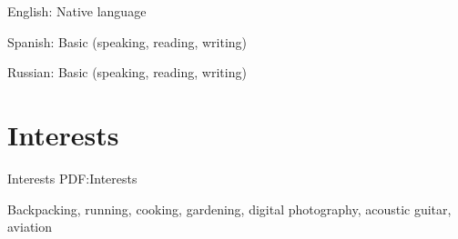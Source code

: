 \documentclass[letterpaper,MMMyyyy,nonstop]{simpleresumecv}
\begin{document}
\begin{body}
\BulletItem
English: Native language

\GapNoBreak
\BulletItem
Spanish: Basic (speaking, reading, writing)

\GapNoBreak
\BulletItem
Russian: Basic (speaking, reading, writing)


\section
{Interests}
{Interests}
{PDF:Interests}

Backpacking,
running,
cooking,
gardening,
digital photography,
acoustic guitar,
aviation








\end{body}
\end{document}
